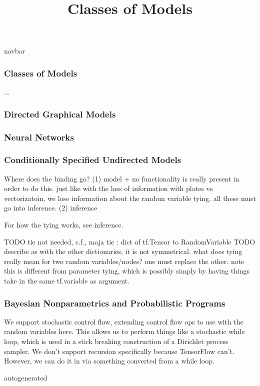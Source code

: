 \title{Classes of Models}

{{navbar}}

\subsubsection{Classes of Models}

...

\subsubsection{Directed Graphical Models}

\subsubsection{Neural Networks}

\subsubsection{Conditionally Specified Undirected Models}

Where does the binding go?
(1) model
+ no functionality is really present in order to do this. just like
with the loss of information with plates vs vectorizatoin, we lose
information about the random variable tying. all these must go into
inference.
(2) inference

For how the tying works, see inference.

TODO tie not needed, c.f., maja
tie : dict of tf.Tensor to RandomVariable
  TODO describe
  as with the other dictionaries, it is not symmetrical. what does
  tying really mean for two random variables/nodes? one must replace
  the other. note this is different from parameter tying, which is
  possibly simply by having things take in the same tf.variable as
  argument.

\subsubsection{Bayesian Nonparametrics and Probabilistic Programs}

We support stochastic control flow, extending control flow ops to use
with the random variables here. This allows us to perform things like
a stochastic while loop, which is used in a stick breaking
construction of a Dirichlet process sampler. We don't support
recursion specifically because TensorFlow can't. However, we can do it
in via something converted from a while loop.

{{autogenerated}}
